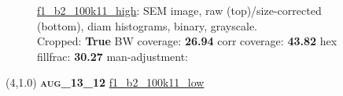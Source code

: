 \begin{figure}[h!]
\label{semimg10}
\caption*{\hyperlink{covtableaug_13_12}{\color{blue} \small \ttfamily f1\_b2\_100k11\_high}: SEM image, raw (top)/size-corrected (bottom), diam histograms, binary, grayscale.\\Cropped: {\bf True} \;\; BW coverage: {\bf 26.94} \:\: corr coverage: {\bf 43.82} \:\: hex fillfrac: {\bf 30.27} \:\: man-adjustment: {\bf \color{blue}{Yes}}}
\end{figure}
\newpage

\begin{textblock}{5}(4,1.0)
{\bf \textsc{aug\_13\_12}}
\hspace{4.5cm}
\hyperlink{covtableaug_13_12}{\color{blue} \large \ttfamily f1\_b2\_100k11\_low}
\end{textblock}

